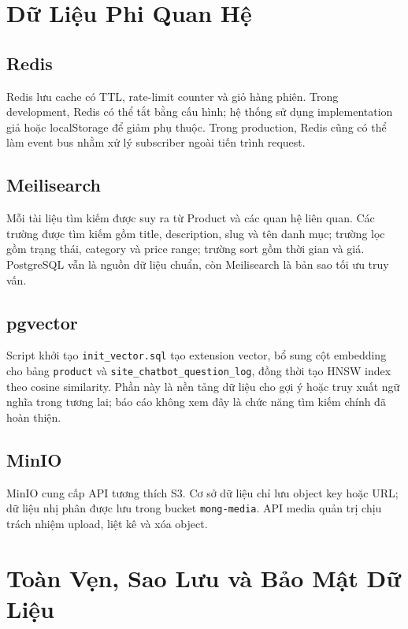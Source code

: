 \section{Dữ Liệu Phi Quan Hệ}

\subsection{Redis}

Redis lưu cache có TTL, rate-limit counter và giỏ hàng phiên. Trong development, Redis có thể tắt bằng cấu hình; hệ thống sử dụng implementation giả hoặc localStorage để giảm phụ thuộc. Trong production, Redis cũng có thể làm event bus nhằm xử lý subscriber ngoài tiến trình request.

\subsection{Meilisearch}

Mỗi tài liệu tìm kiếm được suy ra từ Product và các quan hệ liên quan. Các trường được tìm kiếm gồm title, description, slug và tên danh mục; trường lọc gồm trạng thái, category và price range; trường sort gồm thời gian và giá. PostgreSQL vẫn là nguồn dữ liệu chuẩn, còn Meilisearch là bản sao tối ưu truy vấn.

\subsection{pgvector}

Script khởi tạo \texttt{init\_vector.sql} tạo extension vector, bổ sung cột embedding cho bảng \texttt{product} và \texttt{site\_chatbot\_question\_log}, đồng thời tạo HNSW index theo cosine similarity. Phần này là nền tảng dữ liệu cho gợi ý hoặc truy xuất ngữ nghĩa trong tương lai; báo cáo không xem đây là chức năng tìm kiếm chính đã hoàn thiện.

\subsection{MinIO}

MinIO cung cấp API tương thích S3. Cơ sở dữ liệu chỉ lưu object key hoặc URL; dữ liệu nhị phân được lưu trong bucket \texttt{mong-media}. API media quản trị chịu trách nhiệm upload, liệt kê và xóa object.

\section{Toàn Vẹn, Sao Lưu và Bảo Mật Dữ Liệu}

